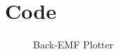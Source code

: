 
\cleardoublepage

\chapter{Code}
\label{Appendix:Key4}

\begin{figure}
	\caption{Back-EMF Plotter}
	
\end{figure}